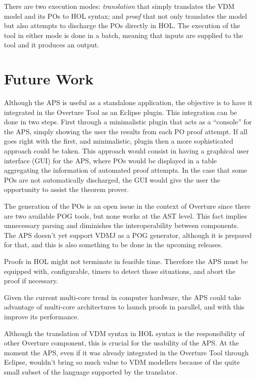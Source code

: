 \documentclass[]{article}
\begin{document}
There are two execution modes: \emph{translation} that simply translates the VDM model and its POs to HOL syntax; and \emph{proof} that not only translates the model but also attempts to discharge the POs directly in HOL.
The execution of the tool in either mode is done in a batch, meaning that inputs are supplied to the tool and it produces an output.

\section{Future Work}
\label{sec:future_work}

Although the APS is useful as a standalone application, the objective is to have it integrated in the Overture Tool as an Eclipse plugin.
This integration can be done in two steps. 
First through a minimalistic plugin that acts as a ``console'' for the APS, simply showing the user the results from each PO proof attempt.
If all goes right with the first, and minimalistic, plugin then a more sophisticated approach could be taken.
This approach would consist in having a graphical user interface (GUI) for the APS, where POs would be displayed in a table aggregating the information of automated proof attempts.
In the case that some POs are not automatically discharged, the GUI would give the user the opportunity to assist the theorem prover.



The generation of the POs is an open issue in the context of Overture since there are two available POG tools, but none works at the AST level.
This fact implies unnecessary parsing and diminishes the interoperability between components.
The APS doesn't yet support VDMJ as a POG generator, although it is prepared for that, and this is also something to be done in the upcoming releases.

Proofs in HOL might not terminate in feasible time.
Therefore the APS must be equipped with, configurable, timers to detect those situations, and abort the proof if necessary.

Given the current multi-core trend in computer hardware, the APS could take advantage of multi-core architectures to launch proofs in parallel, and with this improve its performance.

Although the translation of VDM syntax in HOL syntax is the responsibility of other Overture component, this is crucial for the usability of the APS.
At the moment the APS, even if it was already integrated in the Overture Tool through Eclipse, wouldn't bring so much value to VDM modellers because of the quite small subset of the language supported by the translator.
\end{document}
